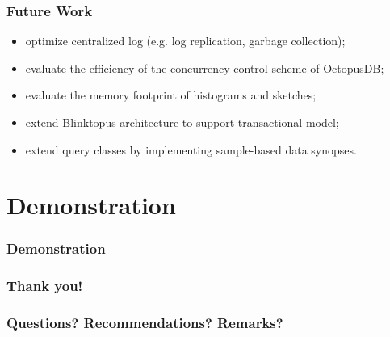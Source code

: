 \documentclass{beamer}
\begin{document}
\begin{frame}
\frametitle{Future Work}
\begin{itemize}
\item{optimize centralized log (e.g. log replication, garbage collection);} \pause
\item{evaluate the efficiency of the concurrency control scheme of OctopusDB;} \pause
\item{evaluate the memory footprint of histograms and sketches;} \pause
\item{extend Blinktopus architecture to support transactional model;} \pause
\item{extend query classes by implementing sample-based data synopses.}
\end{itemize}
\end{frame}

\section{Demonstration}
\begin{frame}
\frametitle{Demonstration}
\end{frame}

\begin{frame}
\frametitle{Thank you!}
\end{frame}

\begin{frame}
 \frametitle{Questions? Recommendations? Remarks?}
\end{frame}
\end{document}
